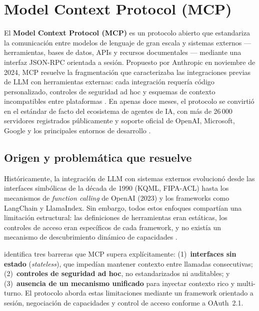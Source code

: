 \section{Model Context Protocol (MCP)}
\label{sec:eda_mcp}

El \textbf{Model Context Protocol (MCP)} es un protocolo abierto que estandariza la comunicación entre modelos de lenguaje de gran escala y sistemas externos --- herramientas, bases de datos, APIs y recursos documentales --- mediante una interfaz JSON-RPC orientada a sesión. Propuesto por Anthropic en noviembre de 2024, MCP resuelve la fragmentación que caracterizaba las integraciones previas de LLM con herramientas externas: cada integración requería código personalizado, controles de seguridad ad hoc y esquemas de contexto incompatibles entre plataformas \citep{ray2025survey, hou2025model, ehtesham2025survey}. En apenas doce meses, el protocolo se convirtió en el estándar de facto del ecosistema de agentes de IA, con más de 26\,000 servidores registrados públicamente y soporte oficial de OpenAI, Microsoft, Google y los principales entornos de desarrollo \citep{hou2025model}.

\subsection{Origen y problemática que resuelve}

Históricamente, la integración de LLM con sistemas externos evolucionó desde las interfaces simbólicas de la década de 1990 (KQML, FIPA-ACL) hasta los mecanismos de \textit{function calling} de OpenAI (2023) y los frameworks como LangChain y LlamaIndex. Sin embargo, todos estos enfoques compartían una limitación estructural: las definiciones de herramientas eran estáticas, los controles de acceso eran específicos de cada framework, y no existía un mecanismo de descubrimiento dinámico de capacidades \citep{ehtesham2025survey}.

\citet{ray2025survey} identifica tres barreras que MCP supera explícitamente: (1)~\textbf{interfaces sin estado} (\textit{stateless}), que impedían mantener contexto entre llamadas consecutivas; (2)~\textbf{controles de seguridad ad hoc}, no estandarizados ni auditables; y (3)~\textbf{ausencia de un mecanismo unificado} para inyectar contexto rico y multi-turno. El protocolo aborda estas limitaciones mediante un framework orientado a sesión, negociación de capacidades y control de acceso conforme a OAuth~2.1.

